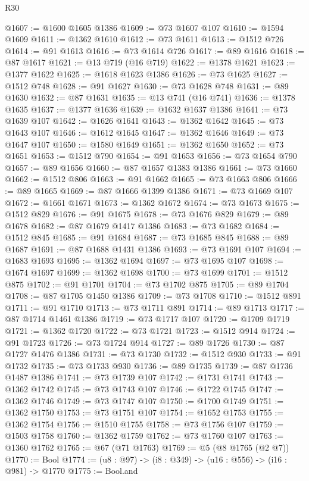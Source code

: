 \begin{lexlean}{R30}
\begin{coremodule}
{{{{{@1607 := @1600 @1605 @1386
@1609 := @73 @1607 @107
@1610 := @1594 @1609
@1611 := @1362 @1610
@1612 := @73 @1611
@1613 := @1512 @726
@1614 := @91 @1613
@1616 := @73 @1614 @726
@1617 := @89 @1616
@1618 := @87 @1617
@1621 := @13 @719 (@16 @719)
@1622 := @1378 @1621
@1623 := @1377 @1622
@1625 := @1618 @1623 @1386
@1626 := @73 @1625
@1627 := @1512 @748
@1628 := @91 @1627
@1630 := @73 @1628 @748
@1631 := @89 @1630
@1632 := @87 @1631
@1635 := @13 @741 (@16 @741)
@1636 := @1378 @1635
@1637 := @1377 @1636
@1639 := @1632 @1637 @1386
@1641 := @73 @1639 @107
@1642 := @1626 @1641
@1643 := @1362 @1642
@1645 := @73 @1643 @107
@1646 := @1612 @1645
@1647 := @1362 @1646
@1649 := @73 @1647 @107
@1650 := @1580 @1649
@1651 := @1362 @1650
@1652 := @73 @1651
@1653 := @1512 @790
@1654 := @91 @1653
@1656 := @73 @1654 @790
@1657 := @89 @1656
@1660 := @87 @1657 @1383 @1386
@1661 := @73 @1660
@1662 := @1512 @806
@1663 := @91 @1662
@1665 := @73 @1663 @806
@1666 := @89 @1665
@1669 := @87 @1666 @1399 @1386
@1671 := @73 @1669 @107
@1672 := @1661 @1671
@1673 := @1362 @1672
@1674 := @73 @1673
@1675 := @1512 @829
@1676 := @91 @1675
@1678 := @73 @1676 @829
@1679 := @89 @1678
@1682 := @87 @1679 @1417 @1386
@1683 := @73 @1682
@1684 := @1512 @845
@1685 := @91 @1684
@1687 := @73 @1685 @845
@1688 := @89 @1687
@1691 := @87 @1688 @1431 @1386
@1693 := @73 @1691 @107
@1694 := @1683 @1693
@1695 := @1362 @1694
@1697 := @73 @1695 @107
@1698 := @1674 @1697
@1699 := @1362 @1698
@1700 := @73 @1699
@1701 := @1512 @875
@1702 := @91 @1701
@1704 := @73 @1702 @875
@1705 := @89 @1704
@1708 := @87 @1705 @1450 @1386
@1709 := @73 @1708
@1710 := @1512 @891
@1711 := @91 @1710
@1713 := @73 @1711 @891
@1714 := @89 @1713
@1717 := @87 @1714 @1461 @1386
@1719 := @73 @1717 @107
@1720 := @1709 @1719
@1721 := @1362 @1720
@1722 := @73 @1721
@1723 := @1512 @914
@1724 := @91 @1723
@1726 := @73 @1724 @914
@1727 := @89 @1726
@1730 := @87 @1727 @1476 @1386
@1731 := @73 @1730
@1732 := @1512 @930
@1733 := @91 @1732
@1735 := @73 @1733 @930
@1736 := @89 @1735
@1739 := @87 @1736 @1487 @1386
@1741 := @73 @1739 @107
@1742 := @1731 @1741
@1743 := @1362 @1742
@1745 := @73 @1743 @107
@1746 := @1722 @1745
@1747 := @1362 @1746
@1749 := @73 @1747 @107
@1750 := @1700 @1749
@1751 := @1362 @1750
@1753 := @73 @1751 @107
@1754 := @1652 @1753
@1755 := @1362 @1754
@1756 := @1510 @1755
@1758 := @73 @1756 @107
@1759 := @1503 @1758
@1760 := @1362 @1759
@1762 := @73 @1760 @107
@1763 := @1360 @1762
@1765 := @67 (@71 @1763)
@1769 := @5 (@8 @1765 (@2 @7))
@1770 := Bool
@1774 := (u8 : @97) -> (i8 : @349) -> (u16 : @556) -> (i16 : @981) -> @1770
@1775 := Bool.and
}}}}}
\end{coremodule}
\end{lexlean}
